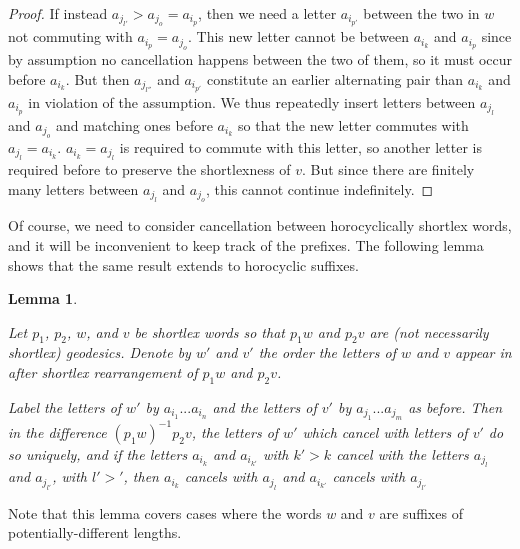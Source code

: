 \documentclass[10pt,a4paper]{amsart}
\newtheorem{lemma}[theorem]{Lemma}
\theoremstyle{definition}
\theoremstyle{remark}
\begin{document}
\begin{proof}
		If instead $a_{j_{l'}}>a_{j_o}=a_{i_p}$, then we need a letter $a_{i_{p'}}$ between the two in $w$ not commuting with $a_{i_{p}}=a_{j_o}$. This new letter cannot be between $a_{i_k}$ and $a_{i_{p}}$ since by assumption no cancellation happens between the two of them, so it must occur before $a_{i_k}$. But then $a_{j_{l''}}$ and $a_{i_{p'}}$ constitute an earlier alternating pair than $a_{i_k}$ and $a_{i_{p}}$ in violation of the assumption. We thus repeatedly insert  letters between $a_{j_l}$ and $a_{j_{o}}$ and matching ones before $a_{i_k}$ so that the new letter commutes with $a_{j_l}=a_{i_{k}}$. $a_{i_{k}}=a_{j_l}$ is required to commute with this letter, so another letter is required before to preserve the shortlexness of $v$. But since there are finitely many letters between $a_{j_l}$ and $a_{j_{o}}$, this cannot continue indefinitely.
	\end{proof}
	
	Of course, we need to consider cancellation between horocyclically shortlex words, and it will be inconvenient to keep track of the prefixes. The following lemma shows that the same result extends to horocyclic suffixes. 
	
	\begin{lemma} \label{HorocyclicNonLinking}
		
		Let $p_1$, $p_2$, $w$, and $v$ be shortlex words so that $p_1w$ and $p_2v$ are (not necessarily shortlex) geodesics. Denote by $w'$ and $v'$ the order the letters of $w$ and $v$ appear in after shortlex rearrangement of $p_1w$ and $p_2v$. 
		
		Label the letters of $w'$ by $a_{i_1}...a_{i_n}$ and the letters of $v'$ by $a_{j_1}...a_{j_m}$ as before. Then in the difference $(p_1w)^{-1}p_2v$, the letters of $w'$ which cancel with letters of $v'$ do so uniquely, and if the letters $a_{i_k}$ and $a_{i_{k'}}$ with $k'>k$ cancel with the letters $a_{j_l}$ and $a_{j_{l'}}$, with $l'>'$, then $a_{i_k}$ cancels with $a_{j_l}$ and $a_{i_{k'}}$ cancels with $a_{j_{l'}}$
		
	\end{lemma}
	
	Note that this lemma covers cases where the words $w$ and $v$ are suffixes of potentially-different lengths.
	
\end{document}
